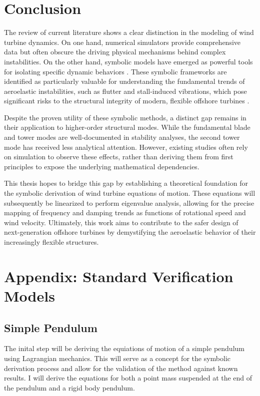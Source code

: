 \documentclass[onecolumn,draftcls]{IEEEtran}
\begin{document}
\section{Conclusion}
The review of current literature shows a clear distinction in the modeling of wind turbine dynamics. On one hand, numerical simulators provide comprehensive data but often obscure the driving physical mechanisms behind complex instabilities. On the other hand, symbolic models have emerged as powerful tools for isolating specific dynamic behaviors \cite{branlard2022symbolic}. These symbolic frameworks are identified as particularly valuable for understanding the fundamental trends of aeroelastic instabilities, such as flutter and stall-induced vibrations, which pose significant risks to the structural integrity of modern, flexible offshore turbines \cite{hansen2007aeroelastic}.

Despite the proven utility of these symbolic methods, a distinct gap remains in their application to higher-order structural modes. While the fundamental blade and tower modes are well-documented in stability analyses, the second tower mode has received less analytical attention. However, existing studies often rely on simulation to observe these effects, rather than deriving them from first principles to expose the underlying mathematical dependencies.

This thesis hopes to bridge this gap by establishing a theoretical foundation for the symbolic derivation of wind turbine equations of motion. These equations will subsequently be linearized to perform eigenvalue analysis, allowing for the precise mapping of frequency and damping trends as functions of rotational speed and wind velocity. Ultimately, this work aims to contribute to the safer design of next-generation offshore turbines by demystifying the aeroelastic behavior of their increasingly flexible structures.

\newpage
\appendix

\section{Appendix: Standard Verification Models}

\subsection{Simple Pendulum}\label{app:simple_pendulum}
The inital step will be deriving the equiations of motion of a simple pendulum using Lagrangian mechanics. This will serve as a concept for the symbolic derivation process and allow for the validation of the method against known results. I will derive the equations for both a point mass suspended at the end of the pendulum and a rigid body pendulum.
\end{document}
